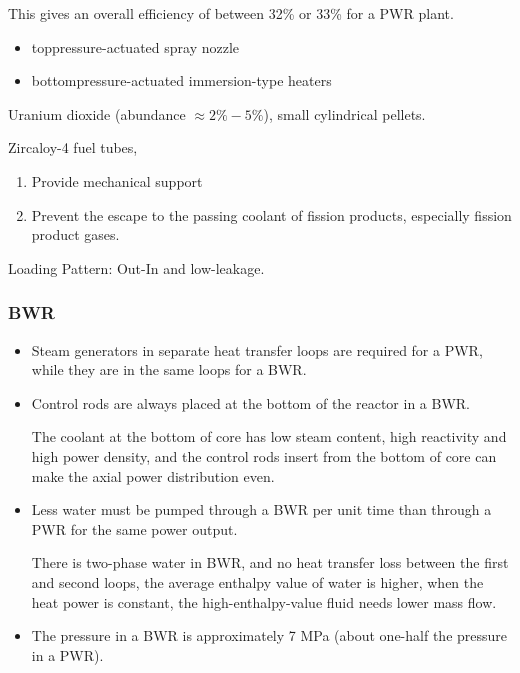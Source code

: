 This gives an overall efficiency of between 32\% or 33\% for a PWR plant.


\begin{itemize}
    \item top\quad pressure-actuated spray nozzle
    \item bottom\quad pressure-actuated immersion-type heaters
\end{itemize}


Uranium dioxide (abundance $\approx 2\%-5\%$), small cylindrical pellets.

Zircaloy-4 fuel tubes, 
\begin{enumerate}
    \item Provide mechanical support
    \item Prevent the escape to the passing coolant of fission products, especially fission product gases.
\end{enumerate}

Loading Pattern: Out-In and low-leakage.

\subsubsection*{BWR}

\begin{itemize}
    \item Steam generators in separate heat transfer loops are required for a PWR, while they are in the same loops for a BWR.
    \item Control rods are always placed at the bottom of the reactor in a BWR.
    \begin{tip}
    The coolant at the bottom of core has low steam content, high reactivity and high power density, and the control rods insert from the bottom of core can make the axial power distribution even.
    \end{tip}
    \item Less water must be pumped through a BWR per unit time than through a PWR for the same power output.
    \begin{tip}
        There is two-phase water in BWR, and no heat transfer loss between the first and second loops, the average enthalpy value of water is higher, when the heat power is constant, the high-enthalpy-value fluid needs lower mass flow.
    \end{tip}
    \item The pressure in a BWR is approximately 7 MPa (about one-half the pressure in a PWR).
\end{itemize}


